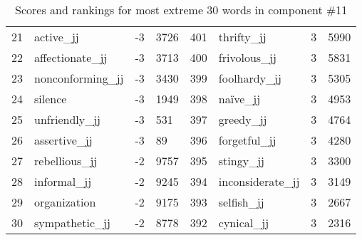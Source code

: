\begin{table}[tbp]
\begin{tabular}{| rlr@{.}l | rlr@{.}l |}
    21 & active\_jj & -3 & 3726    &    401 & thrifty\_jj & 3 & 5990 \\
    22 & affectionate\_jj & -3 & 3713    &    400 & frivolous\_jj & 3 & 5831 \\
    23 & nonconforming\_jj & -3 & 3430    &    399 & foolhardy\_jj & 3 & 5305 \\
    24 & silence & -3 & 1949    &    398 & naïve\_jj & 3 & 4953 \\
    25 & unfriendly\_jj & -3 & 531    &    397 & greedy\_jj & 3 & 4764 \\
    26 & assertive\_jj & -3 & 89    &    396 & forgetful\_jj & 3 & 4280 \\
    27 & rebellious\_jj & -2 & 9757    &    395 & stingy\_jj & 3 & 3300 \\
    28 & informal\_jj & -2 & 9245    &    394 & inconsiderate\_jj & 3 & 3149 \\
    29 & organization & -2 & 9175    &    393 & selfish\_jj & 3 & 2667 \\
    30 & sympathetic\_jj & -2 & 8778    &    392 & cynical\_jj & 3 & 2316 \\
    \hline
    \end{tabular}
    \caption{Scores and rankings for most extreme 30 words in component \#11} 
\end{table}
\clearpage
